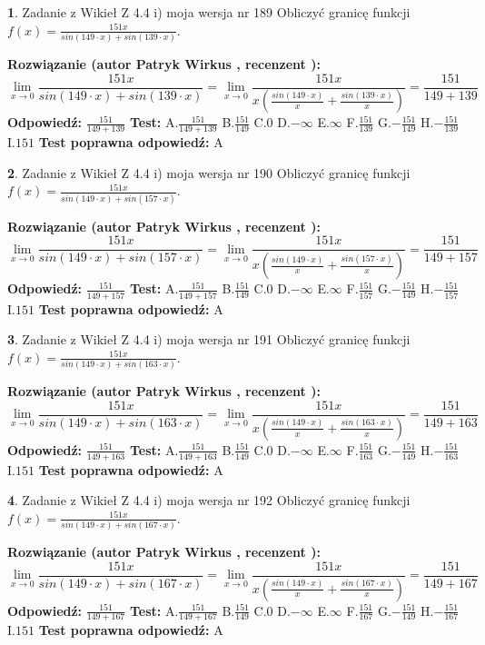 \documentclass[12pt, a4paper]{article}
\theoremstyle{definition} %
\newtheorem{zad}{}
\newcommand{\zadStart}[1]{\begin{zad}#1\newline}
\newcommand{\zadStop}{\end{zad}}
\newcommand{\rozwStart}[2]{\noindent \textbf{Rozwiązanie (autor #1 , recenzent #2): }\newline}
\newcommand{\rozwStop}{\newline}
\newcommand{\odpStart}{\noindent \textbf{Odpowiedź:}\newline}
\newcommand{\odpStop}{\newline}
\newcommand{\testStart}{\noindent \textbf{Test:}\newline}
\newcommand{\testStop}{\newline}
\newcommand{\kluczStart}{\noindent \textbf{Test poprawna odpowiedź:}\newline}
\newcommand{\kluczStop}{\newline}
\begin{document}
\zadStart{Zadanie z Wikieł Z 4.4 i) moja wersja nr 189}
Obliczyć granicę funkcji $f(x)=\frac{151x}{sin(149\cdot x) +sin(139\cdot x)}$.
\zadStop
\rozwStart{Patryk Wirkus}{}
$$\lim\limits_{x\to 0}\frac{151x}{sin(149\cdot x) +sin(139\cdot x)}=\lim\limits_{x\to 0}\frac{151x}{x(\frac{sin(149\cdot x)}{x}+\frac{sin(139\cdot x)}{x})}=\frac{151}{149+139}$$
\rozwStop
\odpStart
$\frac{151}{149+139}$
\odpStop
\testStart
A.$\frac{151}{149+139}$
B.$\frac{151}{149}$
C.$0$
D.$-\infty$
E.$\infty$
F.$\frac{151}{139}$
G.$-\frac{151}{149}$
H.$-\frac{151}{139}$
I.$151$
\testStop
\kluczStart
A
\kluczStop



\zadStart{Zadanie z Wikieł Z 4.4 i) moja wersja nr 190}
Obliczyć granicę funkcji $f(x)=\frac{151x}{sin(149\cdot x) +sin(157\cdot x)}$.
\zadStop
\rozwStart{Patryk Wirkus}{}
$$\lim\limits_{x\to 0}\frac{151x}{sin(149\cdot x) +sin(157\cdot x)}=\lim\limits_{x\to 0}\frac{151x}{x(\frac{sin(149\cdot x)}{x}+\frac{sin(157\cdot x)}{x})}=\frac{151}{149+157}$$
\rozwStop
\odpStart
$\frac{151}{149+157}$
\odpStop
\testStart
A.$\frac{151}{149+157}$
B.$\frac{151}{149}$
C.$0$
D.$-\infty$
E.$\infty$
F.$\frac{151}{157}$
G.$-\frac{151}{149}$
H.$-\frac{151}{157}$
I.$151$
\testStop
\kluczStart
A
\kluczStop



\zadStart{Zadanie z Wikieł Z 4.4 i) moja wersja nr 191}
Obliczyć granicę funkcji $f(x)=\frac{151x}{sin(149\cdot x) +sin(163\cdot x)}$.
\zadStop
\rozwStart{Patryk Wirkus}{}
$$\lim\limits_{x\to 0}\frac{151x}{sin(149\cdot x) +sin(163\cdot x)}=\lim\limits_{x\to 0}\frac{151x}{x(\frac{sin(149\cdot x)}{x}+\frac{sin(163\cdot x)}{x})}=\frac{151}{149+163}$$
\rozwStop
\odpStart
$\frac{151}{149+163}$
\odpStop
\testStart
A.$\frac{151}{149+163}$
B.$\frac{151}{149}$
C.$0$
D.$-\infty$
E.$\infty$
F.$\frac{151}{163}$
G.$-\frac{151}{149}$
H.$-\frac{151}{163}$
I.$151$
\testStop
\kluczStart
A
\kluczStop



\zadStart{Zadanie z Wikieł Z 4.4 i) moja wersja nr 192}
Obliczyć granicę funkcji $f(x)=\frac{151x}{sin(149\cdot x) +sin(167\cdot x)}$.
\zadStop
\rozwStart{Patryk Wirkus}{}
$$\lim\limits_{x\to 0}\frac{151x}{sin(149\cdot x) +sin(167\cdot x)}=\lim\limits_{x\to 0}\frac{151x}{x(\frac{sin(149\cdot x)}{x}+\frac{sin(167\cdot x)}{x})}=\frac{151}{149+167}$$
\rozwStop
\odpStart
$\frac{151}{149+167}$
\odpStop
\testStart
A.$\frac{151}{149+167}$
B.$\frac{151}{149}$
C.$0$
D.$-\infty$
E.$\infty$
F.$\frac{151}{167}$
G.$-\frac{151}{149}$
H.$-\frac{151}{167}$
I.$151$
\testStop
\kluczStart
A
\kluczStop
\end{document}
